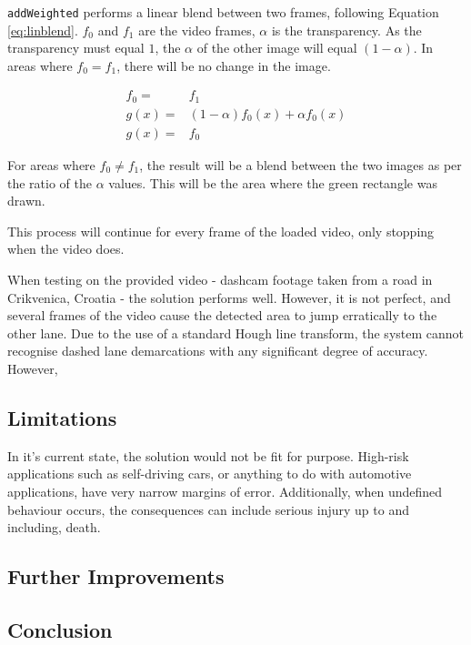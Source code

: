 \documentclass[conference]{IEEEtran}
\begin{document}
\verb|addWeighted| performs a linear blend between two frames, following Equation \ref{eq:linblend}. $f_0$ and $f_1$ are the video frames, $\alpha$ is the transparency. As the transparency must equal $1$, the $\alpha$ of the other image will equal $(1-\alpha)$. In areas where $f_0 = f_1$, there will be no change in the image.

\begin{equation}\label{xx}
\begin{split}
f_0=& f_1\\
g(x)=&(1-\alpha)f_0(x)+\alpha f_0 (x) \\
g(x)=& f_0 
\end{split}
\end{equation}

For areas where $f_0 \neq f_1$, the result will be a blend between the two images as per the ratio of the $\alpha$ values. This will be the area where the green rectangle was drawn.

This process will continue for every frame of the loaded video, only stopping when the video does.

When testing on the provided video - dashcam footage taken from a road in Crikvenica, Croatia - the solution performs well. However, it is not perfect, and several frames of the video cause the detected area to jump erratically to the other lane. Due to the use of a standard Hough line transform, the system cannot recognise dashed lane demarcations with any significant degree of accuracy. However, 

\subsection{Limitations}\label{sec:t2_lim}
In it's current state, the solution would not be fit for purpose. High-risk applications such as self-driving cars, or anything to do with automotive applications, have very narrow margins of error. Additionally, when undefined behaviour occurs, the consequences can include serious injury up to and including, death. 
\subsection{Further Improvements}

\subsection{Conclusion}
\end{document}
